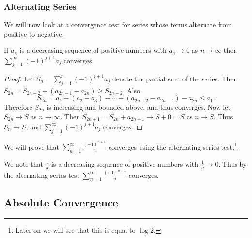 
\subsubsection{Alternating Series}

We will now look at a convergence test for series whose terms alternate from positive to negative.

\begin{theorem}
	If $a_n$ is a decreasing sequence of positive numbers with $a_n \rightarrow 0$ as $n \rightarrow \infty$ then $\sum_{j = 1}^{\infty} (-1)^{j + 1}a_j$ converges.
\end{theorem}
\begin{proof}
	Let $S_n = \sum_{j = 1}^n (-1)^{j + 1}a_j$ denote the partial sum of the series. Then
	$
		S_{2n} = S_{2n - 2} + (a_{2n - 1} - a_{2n}) \geq S_{2n - 2}.
	$
	Also
	$$
		S_{2n} = a_1 - (a_2 - a_3) - \cdots - (a_{2n - 2} - a_{2n - 1}) - a_{2n}
		\leq a_1.
	$$
	Therefore $S_{2n}$ is increasing and bounded above, and thus converges. Now let $S_{2n} \rightarrow S$ as $n \rightarrow \infty$. Then $S_{2n + 1} = S_{2n} + a_{2n + 1} \rightarrow S + 0 = S$ as $n \rightarrow S$. Thus $S_n \rightarrow S$, and $\sum_{j = 1}^{\infty} (-1)^{j + 1}a_j$ converges.
\end{proof}

\begin{example}
	We will prove that $\sum_{n = 1}^{\infty} \frac{(-1)^{n + 1}}{n}$ converges using the alternating series test.\footnote{Later on we will see that this is equal to $\log 2$.}

	We note that $\frac{1}{n}$ is a decreasing sequence of positive numbers with $\frac{1}{n} \rightarrow 0$. Thus by the alternating series test $\sum_{n = 1}^{\infty} \frac{(-1)^{n + 1}}{n}$ converges. 
\end{example}

\subsection{Absolute Convergence}

